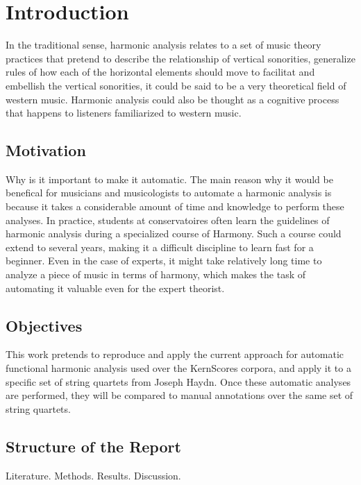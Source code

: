 \chapter{Introduction}
In the traditional sense, harmonic analysis relates to a set of music theory practices that pretend to describe the relationship of vertical sonorities, generalize rules of how each of the horizontal elements should move to facilitat and embellish the vertical sonorities, it could be said to be a very theoretical field of western music. Harmonic analysis could also be thought as a cognitive process that happens to listeners familiarized to western music.

\section{Motivation}
Why is it important to make it automatic.
The main reason why it would be benefical for musicians and musicologists to automate a harmonic analysis is because it takes a considerable amount of time and knowledge to perform these analyses. In practice, students at conservatoires often learn the guidelines of harmonic analysis during a specialized course of Harmony. Such a course could extend to several years, making it a difficult discipline to learn fast for a beginner. Even in the case of experts, it might take relatively long time to analyze a piece of music in terms of harmony, which makes the task of automating it valuable even for the expert theorist.

\section{Objectives}
This work pretends to reproduce and apply the current approach for automatic functional harmonic analysis used over the KernScores corpora, and apply it to a specific set of string quartets from Joseph Haydn. Once these automatic analyses are performed, they will be compared to manual annotations over the same set of string quartets.

\section{Structure of the Report}
Literature. Methods. Results. Discussion.

\newpage
